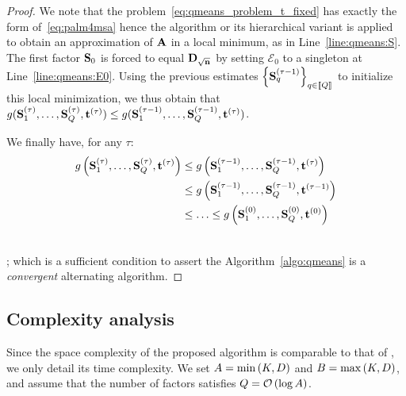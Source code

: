 \begin{proof}
We note that the problem~\eqref{eq:qmeans_problem_t_fixed} has exactly the form of~\eqref{eq:palm4msa} hence the \palm algorithm or its hierarchical variant is applied to obtain an approximation of ${\mathbf{A}}$ in a local minimum, as in Line~\ref{line:qmeans:S}. The first factor ${\mathbf{S}}_0$ is forced to equal ${\mathbf{D}}_{\sqrt{{\mathbf{n}}}}$ by setting $\mathcal{E}_0$ to a singleton at Line~\ref{line:qmeans:E0}. Using the previous estimates $\left \lbrace {\mathbf{S}}_q^{(\tau-1)}\right \rbrace_{q\in\left \llbracket Q\right \rrbracket}$ to initialize this local minimization, we thus obtain that $g({\mathbf{S}}_1^{(\tau)}, \ldots,{\mathbf{S}}_Q^{(\tau)}, {\mathbf{t}}^{(\tau)}) \leq g({\mathbf{S}}_1^{(\tau-1)}, \ldots,{\mathbf{S}}_Q^{(\tau-1)}, {\mathbf{t}}^{(\tau)})$.

We finally have, for any $\tau$:
\begin{align*}
g\left ({\mathbf{S}}_1^{(\tau)}, \ldots,{\mathbf{S}}_Q^{(\tau)}, {\mathbf{t}}^{(\tau)}\right ) & \leq g\left ({\mathbf{S}}_1^{(\tau-1)}, \ldots,{\mathbf{S}}_Q^{(\tau-1)}, {\mathbf{t}}^{(\tau)}\right ) \\
& \leq g\left ({\mathbf{S}}_1^{(\tau-1)}, \ldots,{\mathbf{S}}_Q^{(\tau-1)}, {\mathbf{t}}^{(\tau-1)}\right ) \\
& \leq \ldots \leq g\left ({\mathbf{S}}_1^{(0)}, \ldots,{\mathbf{S}}_Q^{(0)}, {\mathbf{t}}^{(0)}\right )
\end{align*}

~\\
; which is a sufficient condition to assert the Algorithm~\ref{algo:qmeans} is a \textit{convergent} alternating algorithm.

\end{proof}


\subsection{Complexity analysis}

Since the space complexity of the proposed \qkmeans algorithm is comparable to that of \kmeans, we only detail its time complexity. We set $A=\min\left (K, D\right )$ and $B=\max\left (K, D\right )$, and assume that the number of factors satisfies $Q=\mathcal{O}\left(\log A\right)$.

